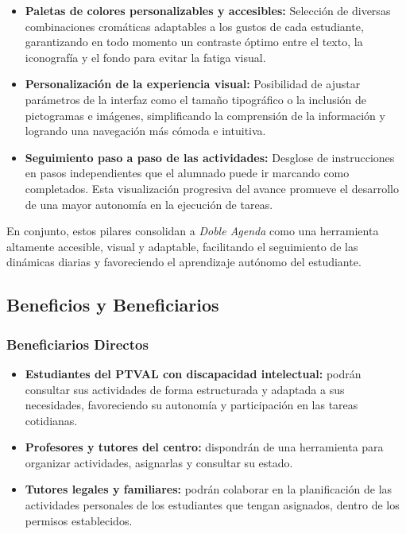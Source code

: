 \begin{itemize}
    \item \textbf{Paletas de colores personalizables y accesibles:} Selección de diversas combinaciones cromáticas adaptables a los gustos de cada estudiante, garantizando en todo momento un contraste óptimo entre el texto, la iconografía y el fondo para evitar la fatiga visual.
    
    \item \textbf{Personalización de la experiencia visual:} Posibilidad de ajustar parámetros de la interfaz como el tamaño tipográfico o la inclusión de pictogramas e imágenes, simplificando la comprensión de la información y logrando una navegación más cómoda e intuitiva.
    
    \item \textbf{Seguimiento paso a paso de las actividades:} Desglose de instrucciones en pasos independientes que el alumnado puede ir marcando como completados. Esta visualización progresiva del avance promueve el desarrollo de una mayor autonomía en la ejecución de tareas.
\end{itemize}

En conjunto, estos pilares consolidan a \textit{Doble Agenda} como una herramienta altamente accesible, visual y adaptable, facilitando el seguimiento de las dinámicas diarias y favoreciendo el aprendizaje autónomo del estudiante.

\subsection{Beneficios y Beneficiarios}

\subsubsection{Beneficiarios Directos}
\begin{itemize}
    \item \textbf{Estudiantes del PTVAL con discapacidad intelectual:} podrán consultar sus actividades de forma estructurada y adaptada a sus necesidades, favoreciendo su autonomía y participación en las tareas cotidianas.
    \item \textbf{Profesores y tutores del centro:} dispondrán de una herramienta para organizar actividades, asignarlas y consultar su estado.
    \item \textbf{Tutores legales y familiares:} podrán colaborar en la planificación de las actividades personales de los estudiantes que tengan asignados, dentro de los permisos establecidos.
\end{itemize}

